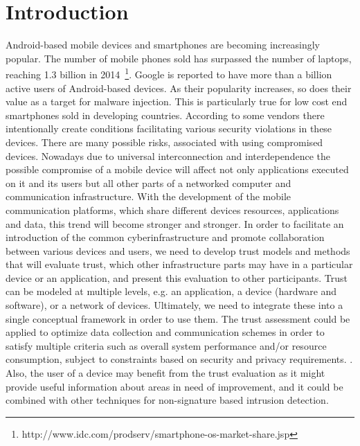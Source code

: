 \section{Introduction}

Android-based mobile devices and smartphones are becoming increasingly popular.  The number of mobile phones
sold has surpassed the number of laptops, reaching 1.3 billion in 
2014~\footnote{http://www.idc.com/prodserv/smartphone-os-market-share.jsp}.  Google is reported\cite{} to have more than
a billion active users of Android-based devices.  As their popularity increases, so does their value as
a target for malware injection.  
This is particularly true for low cost end smartphones sold in developing countries. According to \cite{zheng2014droidray}
some vendors there intentionally create conditions facilitating various security violations in these devices.
 There are many possible risks, associated with using compromised devices.  Nowadays due to universal interconnection and 
interdependence the 
possible compromise of a mobile device will affect not only applications executed on it and its users but all other parts 
of a networked computer and communication infrastructure.
With the development of the mobile communication platforms, which share different devices resources, applications and data, 
this trend will become stronger and stronger. 
In order to facilitate an introduction of the common cyberinfrastructure and promote collaboration between various devices 
and users, we need to develop trust models and methods that will evaluate trust, which other infrastructure parts may have in a 
particular device or an application, and present this evaluation to other participants. Trust can be modeled at 
multiple levels, e.g. an application, a device (hardware and software), or a network of devices.  Ultimately, we need to 
integrate these into a single conceptual framework in order to use them.
The trust assessment  could 
be applied to optimize data collection and communication schemes in order to satisfy multiple criteria such as overall 
system performance and/or resource consumption, subject to constraints based on security and privacy requirements.
. Also, the user of a device may benefit from the trust evaluation as it might 
provide useful information about areas in need of improvement, and it could be combined with other techniques for
 non-signature based intrusion detection.

